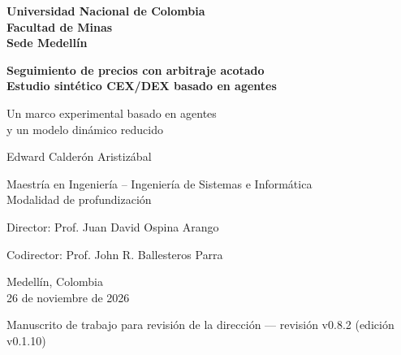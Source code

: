 \documentclass[11pt,letterpaper]{report}
\newcommand{\versionTesis}{v0.1.10}
\newcommand{\revisionManuscrito}{v0.8.2}
\numberwithin{equation}{chapter}
\begin{document}
\begin{titlepage}
  \thispagestyle{empty}
  \centering
  \singlespacing
  {\large\bfseries Universidad Nacional de Colombia\\[2pt]
  Facultad de Minas\\[2pt]
  Sede Medellín\par}
  \vspace{3.2cm}
  {\LARGE\bfseries Seguimiento de precios con arbitraje acotado\\
  Estudio sintético CEX/DEX basado en agentes\par}
  \vspace{0.9cm}
  {\Large Un marco experimental basado en agentes\\
  y un modelo dinámico reducido\par}
  \vspace{2.6cm}
  {\Large Edward Calderón Aristizábal\par}
  \vspace{1.6cm}
  {\large Maestría en Ingeniería -- Ingeniería de Sistemas e Informática\\[2pt]
  Modalidad de profundización\par}
  \vspace{0.8cm}
  {\large Director: Prof. Juan David Ospina Arango\par}
  {\large Codirector: Prof. John R. Ballesteros Parra\par}
  \vfill
  {\large Medellín, Colombia\\[2pt]
  26 de noviembre de 2026\par}
  \vspace{0.3cm}
  {\small Manuscrito de trabajo para revisión de la dirección --- revisión \revisionManuscrito{} (edición \versionTesis{})\par}
\end{titlepage}

\setcounter{page}{1}

\begingroup
\setcounter{secnumdepth}{-1}
\titleformat{\section}{\Large\bfseries}{}{0pt}{}
\singlespacing

\clearpage

\endgroup
\setcounter{secnumdepth}{2}
\end{document}
